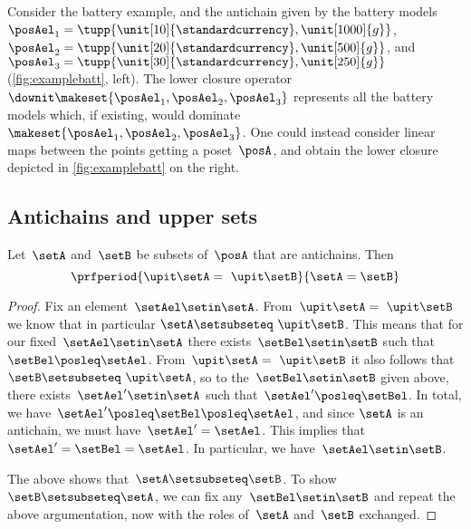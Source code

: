 Consider the battery example, and the antichain given by the battery models~$\posAel_1=\tupp{\unit[10]{\standardcurrency},\unit[1000]{g}}$,~$\posAel_2=\tupp{\unit[20]{\standardcurrency},\unit[500]{g}}$, and~$\posAel_3=\tupp{\unit[30]{\standardcurrency},\unit[250]{g}}$ (\cref{fig:examplebatt}, left).
The lower closure operator~$\downit\makeset{\posAel_1,\posAel_2,\posAel_3}$ represents all the battery models which, if existing, would dominate~$\makeset{\posAel_1,\posAel_2,\posAel_3}$.
One could instead consider linear maps between the points getting a poset~$\posA$, and obtain the lower closure depicted in \cref{fig:examplebatt} on the right.

\begin{figure*}[h!]
    \centering
    \hfill
    \hfill
    \caption{Example of lower closures.}
    \label{fig:examplebatt}
\end{figure*}

\subsection{Antichains and upper sets}

\begin{lemma}
    \label{lem:up-cl-inj-antichains}
    Let~$\setA$ and~$\setB$ be subsets of~$\posA$ that are antichains.
    Then
    \begin{equation}
        \prfperiod{\upit  \setA = \ \upit  \setB}{\setA = \setB}
    \end{equation}
\end{lemma}

\begin{proof}
    Fix an element~$\setAel \setin \setA$.
    From~$\upit  \setA = \ \upit  \setB$ we know that in particular $\setA \setsubseteq \ \upit  \setB$.
    This means that for our fixed~$\setAel \setin \setA$ there exists~$\setBel \setin \setB$ such that~$\setBel \posleq \setAel$.
    From~$\upit \setA = \ \upit  \setB$ it also follows that~$\setB \setsubseteq \ \upit  \setA$, so to the~$\setBel \setin \setB$ given above, there exists~$\setAel' \setin \setA$ such that~$\setAel' \posleq \setBel$.
    In total, we have~$\setAel' \posleq \setBel \posleq \setAel$, and since $\setA$ is an antichain, we must have~$\setAel' = \setAel$.
    This implies that~$\setAel' = \setBel = \setAel$.
    In particular, we have~$\setAel \setin \setB$.

    The above shows that~$\setA \setsubseteq \setB$.
    To show~$\setB \setsubseteq \setA$, we can fix any~$\setBel \setin \setB$ and repeat the above argumentation, now with the roles of~$\setA$ and~$\setB$ exchanged.
\end{proof}

